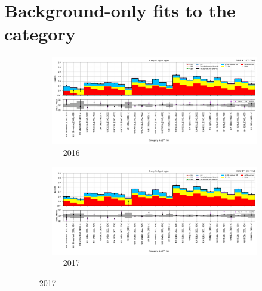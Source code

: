 \clearpage




\section{Background-only fits to the \texorpdfstring{\ttH}{ttH} category}
\label{sec:B_only_fit_plots_ttH_SR}

\begin{figure}[htbp]
    \centering
    \begin{subfigure}[b]{0.9\textwidth}
        \includegraphics[width=\textwidth]{chapters/higgstoinv/figures/mountain_ranges/2016/ttH/SR_tree_fit_b-abs_values_ttH_cats.pdf}
        \caption{\ttH --- 2016}
    \end{subfigure}

    \begin{subfigure}[b]{0.9\textwidth}
        \includegraphics[width=\textwidth]{chapters/higgstoinv/figures/mountain_ranges/2017/ttH/SR_tree_fit_b-abs_values_ttH_cats.pdf}
        \caption{\ttH --- 2017}
    \end{subfigure}


\end{figure}
